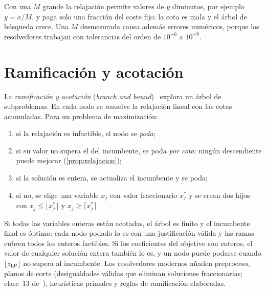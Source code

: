 Con una $M$ grande la relajación permite valores de $y$ diminutos, por ejemplo $y=x/M$, y paga solo una fracción del coste fijo: la cota es mala y el árbol de búsqueda crece. Una $M$ desmesurada causa además errores numéricos, porque los resolvedores trabajan con tolerancias del orden de $10^{-6}$ a $10^{-9}$.

\section{Ramificación y acotación}

La \emph{ramificación y acotación} (\emph{branch and bound})~\cite{landdoig} explora un árbol de subproblemas. En cada nodo se resuelve la relajación lineal con las cotas acumuladas. Para un problema de maximización:
\begin{enumerate}[label=\arabic*.]
  \item si la relajación es infactible, el nodo se \emph{poda};
  \item si su valor no supera el del incumbente, se poda \emph{por cota}: ningún descendiente puede mejorar (\cref{prop:relajacion});
  \item si la solución es entera, se actualiza el incumbente y se poda;
  \item si no, se elige una variable $x_j$ con valor fraccionario $x_j^{*}$ y se crean dos hijos con $x_j\le\lfloor x_j^{*}\rfloor$ y $x_j\ge\lceil x_j^{*}\rceil$.
\end{enumerate}
Si todas las variables enteras están acotadas, el árbol es finito y el incumbente final es óptimo: cada nodo podado lo es con una justificación válida y las ramas cubren todos los enteros factibles. Si los coeficientes del objetivo son enteros, el valor de cualquier solución entera también lo es, y un nodo puede podarse cuando $\lfloor z_{\mathrm{LP}}\rfloor$ no supera al incumbente. Los resolvedores modernos añaden preproceso, planos de corte (desigualdades válidas que eliminan soluciones fraccionarias; clase~13 de~\cite{mit15053}), heurísticas primales y reglas de ramificación elaboradas.

\addtocounter{definicion}{1}%

